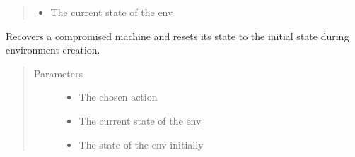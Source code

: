 \documentclass[letterpaper,10pt,english]{sphinxmanual}
\begin{document}
\begin{fulllineitems}
\begin{fulllineitems}
\begin{quote}
\begin{description}
\begin{itemize}
\item {}
\sphinxAtStartPar
{} \textendash{} The current state of the env

\end{itemize}

\end{description}\end{quote}

\end{fulllineitems}


\begin{fulllineitems}
\label{\detokenize{source/yawning_titan.agents.static_agents:yawning_titan.agents.static_agents.simple_blue.SimpleBlue.recover_machines}}
\sphinxAtStartPar
Recovers a compromised machine and resets its state to the
initial state during environment creation.
\begin{quote}\begin{description}
\item[{Parameters}] \leavevmode\begin{itemize}
\item {}
\sphinxAtStartPar
{} \textendash{} The chosen action

\item {}
\sphinxAtStartPar
{} \textendash{} The current state of the env

\item {}
\sphinxAtStartPar
{} \textendash{} The state of the env initially

\end{itemize}

\end{description}\end{quote}

\end{fulllineitems}


\end{fulllineitems}
\end{document}
